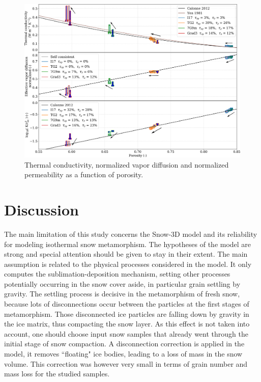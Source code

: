 \documentclass[draft,ms]{agujournal2019}
\begin{document}
\begin{figure}
    \centering
    \includegraphics[width=\linewidth]{Figures/Tplot_tau_invert.pdf}
    \caption{Thermal conductivity, normalized vapor diffusion and normalized permeability as a function of porosity.}
    \label{fig:Tplot}
\end{figure}
\section{Discussion}

The main limitation of this study concerns the Snow-3D model and its reliability for modeling isothermal snow metamorphism. The hypotheses of the model are strong and special attention should be given to stay in their extent. The main assumption is related to the physical processes considered in the model. It only computes the sublimation-deposition mechanism, setting other processes potentially occurring in the snow cover aside, in particular grain settling by gravity. The settling process is decisive in the metamorphism of fresh snow, because lots of disconnections occur between the particles at the first stages of metamorphism. Those disconnected ice particles are falling down by gravity in the ice matrix, thus compacting the snow layer. As this effect is not taken into account, one should choose input snow samples that already went through the initial stage of snow compaction. A disconnection correction is applied in the model, it removes ``floating" ice bodies, leading to a loss of mass in the snow volume. This correction was however very small in terms of grain number and mass loss for the studied samples.\\
\end{document}
